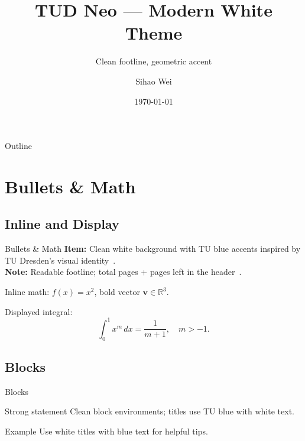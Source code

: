 \documentclass[aspectratio=169, xcolor=table]{beamer}
\title[TUD Neo Demo]{TUD Neo — Modern White Theme}
\subtitle{Clean footline, geometric accent}
\author[Sihao Wei]{Sihao Wei}
\institute[Faculty of Transportation and Traffic Sciences]{Faculty of Transportation and Traffic Sciences}
\date{\today}
\begin{document}
\begin{frame}[plain]
  \vspace*{1.2cm}
  \centering
  {\LARGE \inserttitle\par}
  \vspace{0.4cm}
  {\normalsize \insertsubtitle\par}
  \vspace{0.8cm}
  {\large \insertauthor\par}
  {\small \insertinstitute\par}
  \vspace{0.6cm}
  {\small \insertdate\par}
  \vspace{0.8cm}
\end{frame}

\begin{frame}{Outline}
  \tableofcontents
\end{frame}

\section{Bullets \& Math}
\subsection{Inline and Display}

\begin{frame}{Bullets \& Math}
  \textbf{Item:} Clean white background with TU blue accents inspired by TU Dresden's visual identity~\cite{dantzig1951}.\\
  \textbf{Note:} Readable footline; total pages + pages left in the header~\cite{berge1963}.

  \medskip
  Inline math: \( f(x)=x^2 \), bold vector \( \bm{v}\in\mathbb{R}^3 \).

  \medskip
  Displayed integral:
  \[
    \int_0^1 x^m\,dx = \frac{1}{m+1},\quad m> -1.
  \]
\end{frame}

\subsection{Blocks}

\begin{frame}{Blocks}
  \begin{block}{Strong statement}
    Clean block environments; titles use TU blue with white text.
  \end{block}
  \begin{exampleblock}{Example}
    Use white titles with blue text for helpful tips.
  \end{exampleblock}
\end{frame}
\end{document}
